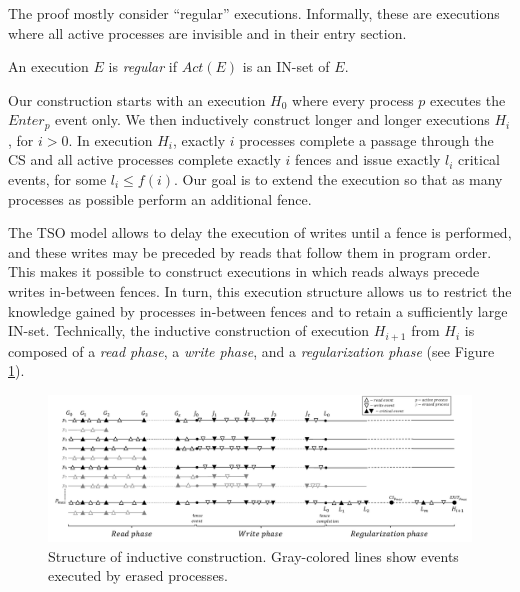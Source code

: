 The proof mostly consider ``regular'' executions. Informally, these are executions where all active processes are invisible and in their entry section.
	
\begin{definition} \label{defenition: regular-execution}
	An execution $E$ is \emph{regular} if $Act(E)$ is an IN-set of $E$.
\end{definition}

Our construction starts with an execution $H_0$ where every process $p$ executes the $Enter_p$ event only. We then inductively construct longer and longer executions $H_i$, for $i>0$. In execution $H_i$, exactly $i$ processes complete a passage through the CS and all active processes complete exactly $i$ fences and issue exactly $l_i$ critical events, for some $l_i \leq f(i)$. Our goal is to extend the execution so that as many processes as possible perform an additional fence.

The TSO model allows to delay the execution of writes until a fence is performed, and these writes may be preceded by reads that follow them in program order. This makes it possible to construct executions in which reads always precede writes in-between fences. In turn, this execution structure allows us to restrict the knowledge gained by processes in-between fences and to retain a sufficiently large IN-set. Technically, the inductive construction of  execution $H_{i+1}$ from $H_i$ is composed of a \emph{read phase}, a \emph{write phase}, and a \emph{regularization phase} (see Figure \ref{figure:ConstructionScheme}).


\begin{figure}
\begin{center}
\includegraphics[scale=0.55]{ConstructionScheme3.pdf}
\end{center}
\vspace{-6pt}
\caption{\small Structure of inductive construction. Gray-colored lines show events executed by erased processes.}
\label{figure:ConstructionScheme}
\end{figure}

